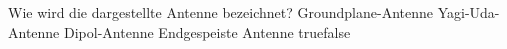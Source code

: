     {Wie wird die dargestellte Antenne bezeichnet?}
    {Groundplane-Antenne}
    {Yagi-Uda-Antenne}
    {Dipol-Antenne}
    {Endgespeiste Antenne}
    {true}{false}